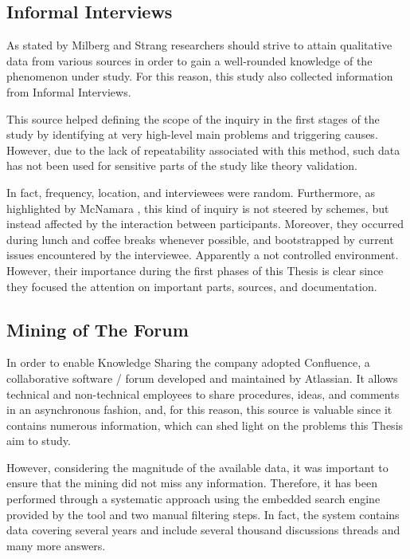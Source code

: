 
\subsection{Informal Interviews}
As stated by Milberg and Strang \cite{informal_interview} researchers should strive to attain qualitative data from various sources in order to gain a well-rounded knowledge of the phenomenon under study. For this reason, this study also collected information from Informal Interviews.

This source helped defining the scope of the inquiry in the first stages of the study by identifying at very high-level main problems and triggering causes. However, due to the lack of repeatability associated with this method, such data has not been used for sensitive parts of the study like theory validation.

In fact, frequency, location, and interviewees were random. Furthermore, as highlighted by McNamara \cite{general_guidelines_for_interview}, this kind of inquiry is not steered by schemes, but instead affected by the interaction between participants. Moreover, they occurred during lunch and coffee breaks whenever possible, and bootstrapped by current issues encountered by the interviewee. Apparently a not controlled environment. However, their importance during the first phases of this Thesis is clear since they focused the attention on important parts, sources, and documentation.

\subsection{Mining of The Forum} \label{mining_forum}
In order to enable Knowledge Sharing the company adopted Confluence, a collaborative software / forum developed and maintained by Atlassian. It allows technical and non-technical employees to share procedures, ideas, and comments in an asynchronous fashion, and, for this reason, this source is valuable since it contains numerous information, which can shed light on the problems this Thesis aim to study.

However, considering the magnitude of the available data, it was important to ensure that the mining did not miss any information. Therefore, it has been performed through a systematic approach using the embedded search engine provided by the tool and two manual filtering steps. In fact, the system contains data covering several years and include several thousand discussions threads and many more answers. 

